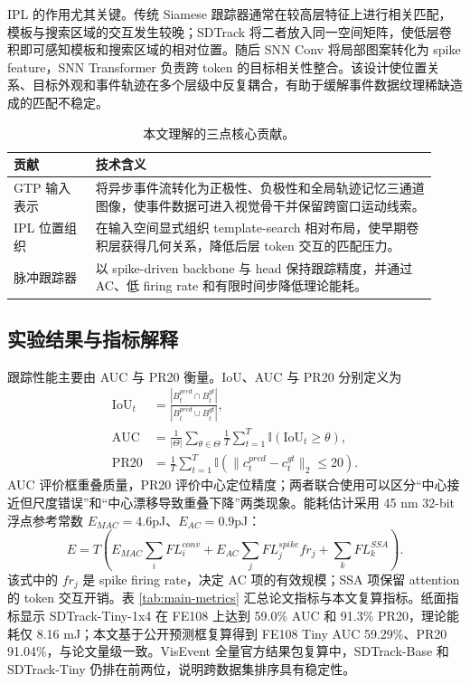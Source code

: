 \documentclass[UTF8,a4paper,zihao=-4]{ctexart}
\begin{document}
IPL 的作用尤其关键。传统 Siamese 跟踪器通常在较高层特征上进行相关匹配，模板与搜索区域的交互发生较晚；SDTrack 将二者放入同一空间矩阵，使低层卷积即可感知模板和搜索区域的相对位置。随后 SNN Conv 将局部图案转化为 spike feature，SNN Transformer 负责跨 token 的目标相关性整合。该设计使位置关系、目标外观和事件轨迹在多个层级中反复耦合，有助于缓解事件数据纹理稀缺造成的匹配不稳定。

\begin{table}[H]
\centering
\scriptsize
\caption{本文理解的三点核心贡献。}
\label{tab:core-contrib}
\begin{tabular}{p{0.18\linewidth}p{0.75\linewidth}}
\toprule
贡献 & 技术含义\\
\midrule
GTP 输入表示 & 将异步事件流转化为正极性、负极性和全局轨迹记忆三通道图像，使事件数据可进入视觉骨干并保留跨窗口运动线索。\\
IPL 位置组织 & 在输入空间显式组织 template-search 相对布局，使早期卷积层获得几何关系，降低后层 token 交互的匹配压力。\\
脉冲跟踪器 & 以 spike-driven backbone 与 head 保持跟踪精度，并通过 AC、低 firing rate 和有限时间步降低理论能耗。\\
\bottomrule
\end{tabular}
\end{table}

\subsection{实验结果与指标解释}
跟踪性能主要由 AUC 与 PR20 衡量。IoU、AUC 与 PR20 分别定义为
\begin{align}
\mathrm{IoU}_t&=\frac{|B_t^{pred}\cap B_t^{gt}|}{|B_t^{pred}\cup B_t^{gt}|},\\
\mathrm{AUC}&=\frac{1}{|\Theta|}\sum_{\theta\in\Theta}\frac{1}{T}\sum_{t=1}^{T}\mathbb{I}(\mathrm{IoU}_t\ge \theta),\\
\mathrm{PR20}&=\frac{1}{T}\sum_{t=1}^{T}\mathbb{I}(\|c_t^{pred}-c_t^{gt}\|_2\le20).
\end{align}
AUC 评价框重叠质量，PR20 评价中心定位精度；两者联合使用可以区分“中心接近但尺度错误”和“中心漂移导致重叠下降”两类现象。能耗估计采用 45 nm 32-bit 浮点参考常数 $E_{MAC}=4.6$pJ、$E_{AC}=0.9$pJ：
\begin{equation}
E=T\left(E_{MAC}\sum_i FL_i^{conv}+E_{AC}\sum_j FL_j^{spike}fr_j+\sum_k FL_k^{SSA}\right).
\end{equation}
该式中的 $fr_j$ 是 spike firing rate，决定 AC 项的有效规模；SSA 项保留 attention 的 token 交互开销。表 \ref{tab:main-metrics} 汇总论文指标与本文复算指标。纸面指标显示 SDTrack-Tiny-1x4 在 FE108 上达到 59.0\% AUC 和 91.3\% PR20，理论能耗仅 8.16 mJ；本文基于公开预测框复算得到 FE108 Tiny AUC 59.29\%、PR20 91.04\%，与论文量级一致。VisEvent 全量官方结果包复算中，SDTrack-Base 和 SDTrack-Tiny 仍排在前两位，说明跨数据集排序具有稳定性。
\end{document}
